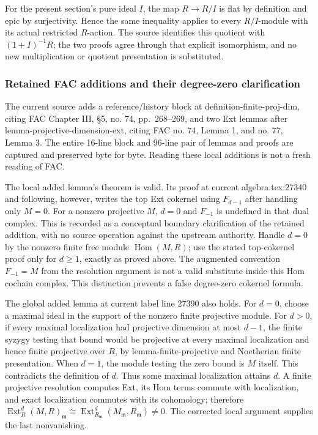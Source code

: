 For the present section's pure ideal \(I\), the map \(R\to R/I\) is flat by definition and epic by surjectivity. Hence the same inequality applies to every \(R/I\)-module with its actual restricted \(R\)-action. The source identifies this quotient with \((1+I)^{-1}R\); the two proofs agree through that explicit isomorphism, and no new multiplication or quotient presentation is substituted.

\subsubsection{Retained FAC additions and their degree-zero clarification}\label{retained-fac-additions-and-their-degree-zero-clarification}

The current source adds a reference/history block at definition-finite-proj-dim, citing FAC Chapter III, §5, no. 74, pp.~268--269, and two Ext lemmas after lemma-projective-dimension-ext, citing FAC no. 74, Lemma 1, and no. 77, Lemma 3. The entire 16-line block and 96-line pair of lemmas and proofs are captured and preserved byte for byte. Reading these local additions is not a fresh reading of FAC.

The local added lemma's theorem is valid. Its proof at current algebra.tex:27340 and following, however, writes the top Ext cokernel using \(F_{d-1}\) after handling only \(M=0\). For a nonzero projective \(M\), \(d=0\) and \(F_{-1}\) is undefined in that dual complex. This is recorded as a conceptual boundary clarification of the retained addition, with no source operation against the upstream authority. Handle \(d=0\) by the nonzero finite free module \(\operatorname{Hom}(M,R)\); use the stated top-cokernel proof only for \(d\ge1\), exactly as proved above. The augmented convention \(F_{-1}=M\) from the resolution argument is not a valid substitute inside this Hom cochain complex. This distinction prevents a false degree-zero cokernel formula.

The global added lemma at current label line 27390 also holds. For \(d=0\), choose a maximal ideal in the support of the nonzero finite projective module. For \(d>0\), if every maximal localization had projective dimension at most \(d-1\), the finite syzygy testing that bound would be projective at every maximal localization and hence finite projective over \(R\), by lemma-finite-projective and Noetherian finite presentation. When \(d=1\), the module testing the zero bound is \(M\) itself. This contradicts the definition of \(d\). Thus some maximal localization attains \(d\). A finite projective resolution computes Ext, its Hom terms commute with localization, and exact localization commutes with its cohomology; therefore \(\operatorname{Ext}^d_R(M,R)_{\mathfrak m}
\cong\operatorname{Ext}^d_{R_{\mathfrak m}}(M_{\mathfrak m},R_{\mathfrak m})\ne0\). The corrected local argument supplies the last nonvanishing.

